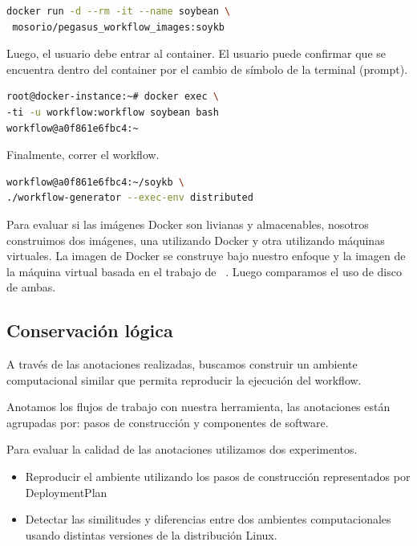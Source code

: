 \begin{lstlisting}[caption={Descarga y correr la imagen disponible en DockerHub mosorio/pegasus\_workflow\_images:soykb},label={lst:1},language=bash]
docker run -d --rm -it --name soybean \
 mosorio/pegasus_workflow_images:soykb
\end{lstlisting}

Luego, el usuario debe entrar al container. El usuario puede confirmar que se encuentra dentro del container por el cambio de símbolo de la terminal  (prompt).

\begin{lstlisting}[caption={Entrar al ambiente computacional utilizando bash},label={lst:2},language=bash]
root@docker-instance:~# docker exec \
-ti -u workflow:workflow soybean bash
workflow@a0f861e6fbc4:~ 
\end{lstlisting}

Finalmente, correr el workflow. 

\begin{lstlisting}[caption={Run the workflow},label={lst:3},language=bash]
workflow@a0f861e6fbc4:~/soykb \
./workflow-generator --exec-env distributed	
\end{lstlisting}

Para evaluar si las imágenes Docker son livianas y almacenables, nosotros construimos dos imágenes, una utilizando Docker y otra utilizando máquinas virtuales. La imagen de Docker se construye bajo nuestro enfoque y la imagen de la máquina virtual basada en el trabajo de ~\cite{santana2017reproducibility}. Luego comparamos el uso de disco de ambas.



\subsection{Conservación lógica}\label{s5.3}

A través de las anotaciones realizadas, buscamos construir un ambiente computacional similar que permita reproducir la ejecución del workflow. 

Anotamos los flujos de trabajo con nuestra herramienta, las anotaciones están agrupadas por: pasos de construcción y componentes de software. 

Para evaluar la calidad de las anotaciones utilizamos dos experimentos.

\begin{itemize}
	\item Reproducir el ambiente utilizando los pasos de construcción representados por DeploymentPlan
	\item Detectar las similitudes y diferencias entre dos ambientes computacionales usando distintas versiones de la distribución Linux.
\end{itemize}

